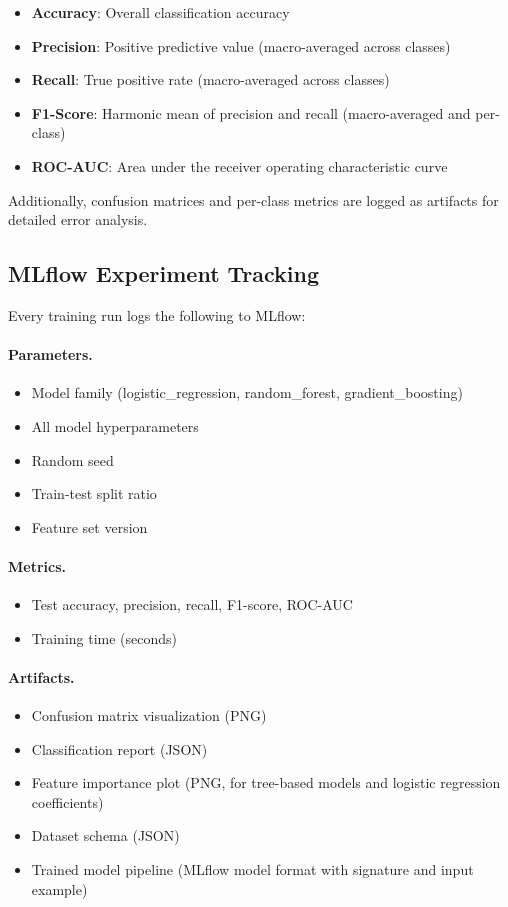 \documentclass[11pt,a4paper]{article}
\begin{document}
\begin{itemize}
    \item \textbf{Accuracy}: Overall classification accuracy
    \item \textbf{Precision}: Positive predictive value (macro-averaged across classes)
    \item \textbf{Recall}: True positive rate (macro-averaged across classes)
    \item \textbf{F1-Score}: Harmonic mean of precision and recall (macro-averaged and per-class)
    \item \textbf{ROC-AUC}: Area under the receiver operating characteristic curve
\end{itemize}

Additionally, confusion matrices and per-class metrics are logged as artifacts for detailed error analysis.

\subsection{MLflow Experiment Tracking}

Every training run logs the following to MLflow:

\paragraph{Parameters.}
\begin{itemize}
    \item Model family (logistic\_regression, random\_forest, gradient\_boosting)
    \item All model hyperparameters
    \item Random seed
    \item Train-test split ratio
    \item Feature set version
\end{itemize}

\paragraph{Metrics.}
\begin{itemize}
    \item Test accuracy, precision, recall, F1-score, ROC-AUC
    \item Training time (seconds)
\end{itemize}

\paragraph{Artifacts.}
\begin{itemize}
    \item Confusion matrix visualization (PNG)
    \item Classification report (JSON)
    \item Feature importance plot (PNG, for tree-based models and logistic regression coefficients)
    \item Dataset schema (JSON)
    \item Trained model pipeline (MLflow model format with signature and input example)
\end{itemize}
\end{document}
